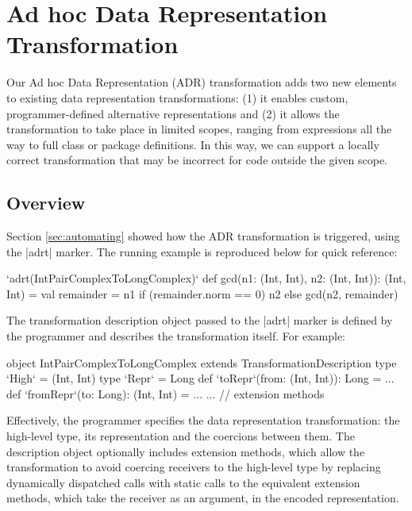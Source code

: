 \section{Ad hoc Data Representation Transformation}
\label{sec:ildl}

Our Ad hoc Data Representation (ADR) transformation adds two new
elements to existing data representation transformations: (1) it
enables custom, programmer-defined alternative representations and
(2) it allows the transformation to take place in limited scopes,
ranging from expressions all the way to full class or package
definitions. In this way, we can support a locally correct
transformation that may be incorrect for code outside the given scope.

\subsection{Overview}
\label{sec:ildl:user-story}

Section \ref{sec:automating} showed how the ADR transformation is triggered, using the |adrt| marker. The running example is reproduced below for quick
reference:

\begin{lstlisting-nobreak}
`adrt(IntPairComplexToLongComplex)` {
  def gcd(n1: (Int, Int), n2: (Int, Int)): (Int, Int) = {
    val remainder = n1 %
    if (remainder.norm == 0) n2 else gcd(n2, remainder)
  }
}
\end{lstlisting-nobreak}

The transformation description object passed to the |adrt| marker is defined by the programmer and describes the transformation itself. For example:

\begin{lstlisting-nobreak}
object IntPairComplexToLongComplex extends TransformationDescription {
  type `High` = (Int, Int)
  type `Repr` = Long
  def `toRepr`(from: (Int, Int)): Long = ...
  def `fromRepr`(to: Long): (Int, Int) = ...
  ... // extension methods
}
\end{lstlisting-nobreak}

Effectively, the programmer specifies the data representation transformation: the high-level type, its representation and the coercions between them. The description object optionally includes extension methods, which allow the transformation to avoid coercing receivers to the high-level type by replacing dynamically dispatched calls with static calls to the equivalent extension methods, which take the receiver as an argument, in the encoded representation.

